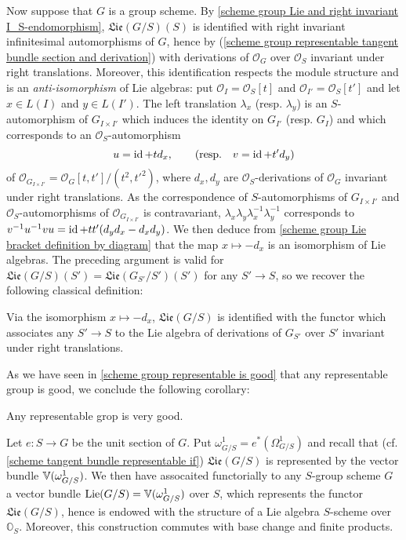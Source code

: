 Now suppose that $G$ is a group scheme. By \cref{scheme group Lie and right invariant I_S-endomorphism}, $\mathfrak{Lie}(G/S)(S)$ is identified with right invariant infinitesimal automorphisms of $G$, hence by (\ref{scheme group representable tangent bundle section and derivation}) with derivations of $\mathscr{O}_G$ over $\mathscr{O}_S$ invariant under right translations. Moreover, this identification respects the module structure and is an \textit{anti-isomorphism} of Lie algebras: put $\mathscr{O}_I=\mathscr{O}_S[t]$ and $\mathscr{O}_{I'}=\mathscr{O}_S[t']$ and let $x\in L(I)$ and $y\in L(I')$. The left translation $\lambda_x$ (resp. $\lambda_y$) is an $S$-automorphism of $G_{I\times I'}$ which induces the identity on $G_{I'}$ (resp. $G_I$) and which corresponds to an $\mathscr{O}_S$-automorphism
\[u=\operatorname{id}+td_x,\quad\quad (\text{resp.}\quad v=\operatorname{id}+t'd_y)\]
of $\mathscr{O}_{G_{I\times I'}}=\mathscr{O}_G[t,t']/(t^2,t'^2)$, where $d_x,d_y$ are $\mathscr{O}_S$-derivations of $\mathscr{O}_G$ invariant under right translations. As the correspondence of $S$-automorphisms of $G_{I\times I'}$ and $\mathscr{O}_S$-automorphisms of $\mathscr{O}_{G_{I\times I'}}$ is contravariant, $\lambda_x\lambda_y\lambda_x^{-1}\lambda_y^{-1}$ corresponds to $v^{-1}u^{-1}vu=\operatorname{id}+tt'(d_yd_x-d_xd_y)$. We then deduce from \cref{scheme group Lie bracket definition by diagram} that the map $x\mapsto-d_x$ is an isomorphism of Lie algebras. The preceding argument is valid for $\mathfrak{Lie}(G/S)(S')=\mathfrak{Lie}(G_{S'}/S')(S')$ for any $S'\to S$, so we recover the following classical definition:

\begin{proposition}\label{scheme group scheme Lie algebra isomorphic to derivation}
Via the isomorphism $x\mapsto -d_x$, $\mathfrak{Lie}(G/S)$ is identified with the functor which associates any $S'\to S$ to the Lie algebra of derivations of $G_{S'}$ over $S'$ invariant under right translations.
\end{proposition}

As we have seen in \cref{scheme group representable is good} that any representable group is good, we conclude the following corollary:

\begin{corollary}\label{scheme group representable is very good}
Any representable grop is very good.
\end{corollary}

Let $e:S\to G$ be the unit section of $G$. Put $\omega_{G/S}^1=e^*(\Omega_{G/S}^1)$ and recall that (cf. \cref{scheme tangent bundle representable if}) $\mathfrak{Lie}(G/S)$ is represented by the vector bundle $\mathbb{V}(\omega_{G/S}^1)$. We then have assocaited functorially to any $S$-group scheme $G$ a vector bundle $\mathrm{Lie}(G/S)=\mathbb{V}(\omega_{G/S}^1)$ over $S$, which represents the functor $\mathfrak{Lie}(G/S)$, hence is endowed with the structure of a Lie algebra $S$-scheme over $\mathbb{O}_S$. Moreover, this construction commutes with base change and finite products.

